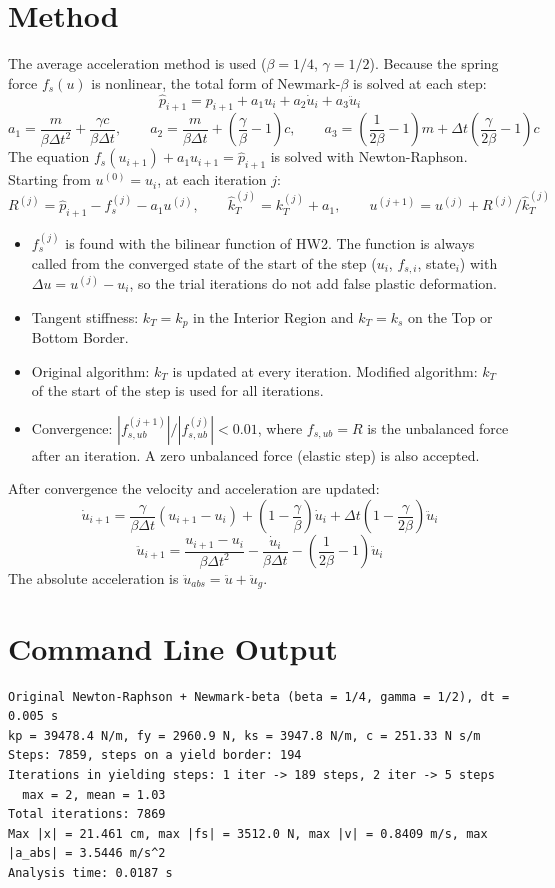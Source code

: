 \documentclass[11pt,a4paper]{article}
\begin{document}
\section{Method}
The average acceleration method is used ($\beta = 1/4$, $\gamma = 1/2$). Because the
spring force $f_s(u)$ is nonlinear, the total form of Newmark-$\beta$ is solved at each step:
\[
\hat{p}_{i+1} = p_{i+1} + a_1 u_i + a_2 \dot{u}_i + a_3 \ddot{u}_i
\]
\[
a_1 = \frac{m}{\beta\Delta t^2} + \frac{\gamma c}{\beta\Delta t}, \qquad
a_2 = \frac{m}{\beta\Delta t} + \left(\frac{\gamma}{\beta}-1\right)c, \qquad
a_3 = \left(\frac{1}{2\beta}-1\right)m + \Delta t\left(\frac{\gamma}{2\beta}-1\right)c
\]
The equation $f_s(u_{i+1}) + a_1 u_{i+1} = \hat{p}_{i+1}$ is solved with Newton-Raphson.
Starting from $u^{(0)} = u_i$, at each iteration $j$:
\[
R^{(j)} = \hat{p}_{i+1} - f_s^{(j)} - a_1 u^{(j)}, \qquad
\hat{k}_T^{(j)} = k_T^{(j)} + a_1, \qquad
u^{(j+1)} = u^{(j)} + R^{(j)}/\hat{k}_T^{(j)}
\]
\begin{itemize}
  \item $f_s^{(j)}$ is found with the bilinear function of HW2. The function is always called
        from the converged state of the start of the step ($u_i$, $f_{s,i}$, state$_i$) with
        $\Delta u = u^{(j)} - u_i$, so the trial iterations do not add false plastic deformation.
  \item Tangent stiffness: $k_T = k_p$ in the Interior Region and $k_T = k_s$ on the Top or Bottom Border.
  \item Original algorithm: $k_T$ is updated at every iteration.
        Modified algorithm: $k_T$ of the start of the step is used for all iterations.
  \item Convergence: $|f^{(j+1)}_{s,ub}| / |f^{(j)}_{s,ub}| < 0.01$, where $f_{s,ub} = R$ is the
        unbalanced force after an iteration. A zero unbalanced force (elastic step) is also accepted.
\end{itemize}
After convergence the velocity and acceleration are updated:
\[
\dot{u}_{i+1} = \frac{\gamma}{\beta\Delta t}(u_{i+1}-u_i) + \left(1-\frac{\gamma}{\beta}\right)\dot{u}_i
              + \Delta t\left(1-\frac{\gamma}{2\beta}\right)\ddot{u}_i
\]
\[
\ddot{u}_{i+1} = \frac{u_{i+1}-u_i}{\beta\Delta t^2} - \frac{\dot{u}_i}{\beta\Delta t}
               - \left(\frac{1}{2\beta}-1\right)\ddot{u}_i
\]
The absolute acceleration is $\ddot{u}_{abs} = \ddot{u} + \ddot{u}_g$.

\section{Command Line Output}
\begin{lstlisting}
Original Newton-Raphson + Newmark-beta (beta = 1/4, gamma = 1/2), dt = 0.005 s
kp = 39478.4 N/m, fy = 2960.9 N, ks = 3947.8 N/m, c = 251.33 N s/m
Steps: 7859, steps on a yield border: 194
Iterations in yielding steps: 1 iter -> 189 steps, 2 iter -> 5 steps
  max = 2, mean = 1.03
Total iterations: 7869
Max |x| = 21.461 cm, max |fs| = 3512.0 N, max |v| = 0.8409 m/s, max |a_abs| = 3.5446 m/s^2
Analysis time: 0.0187 s
\end{lstlisting}
\end{document}

